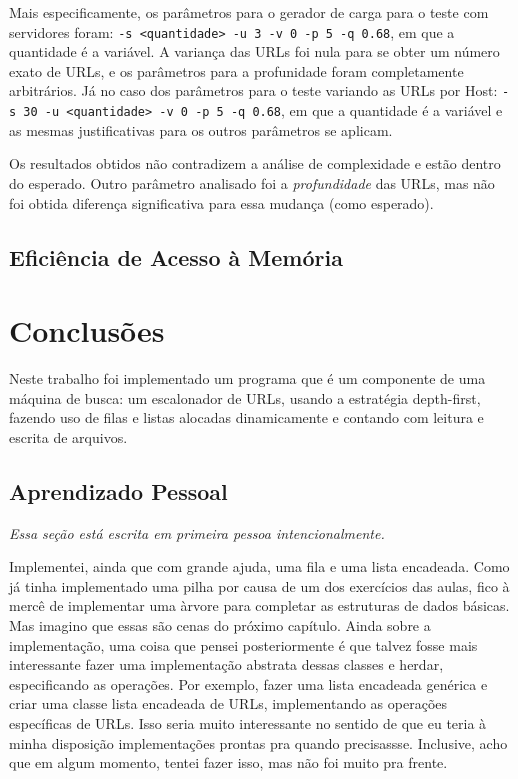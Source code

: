 \documentclass{article}
\def\code#1{\texttt{#1}}
\begin{document}
Mais especificamente, os parâmetros para o gerador de carga para o teste com servidores foram: \code{-s <quantidade> -u 3 -v 0 -p 5 -q 0.68}, em que a quantidade é a variável. A variança das URLs foi nula para se obter um número exato de URLs, e os parâmetros para a profunidade foram completamente arbitrários. Já no caso dos parâmetros para o teste variando as URLs por Host: \code{-s 30 -u <quantidade> -v 0 -p 5 -q 0.68}, em que a quantidade é a variável e as mesmas justificativas para os outros parâmetros se aplicam.

Os resultados obtidos não contradizem a análise de complexidade e estão dentro do esperado. Outro parâmetro analisado foi a \textit{profundidade} das URLs, mas não foi obtida diferença significativa para essa mudança (como esperado).

\subsection{Eficiência de Acesso à Memória}


\section{Conclusões}

Neste trabalho foi implementado um programa que é um componente de uma máquina de busca: um escalonador de URLs, usando a estratégia depth-first, fazendo uso de filas e listas alocadas dinamicamente e contando com leitura e escrita de arquivos.

\subsection{Aprendizado Pessoal}

\textit{Essa seção está escrita em primeira pessoa intencionalmente.}

Implementei, ainda que com grande ajuda, uma fila e uma lista encadeada. Como já tinha implementado uma pilha por causa de um dos exercícios das aulas, fico à mercê de implementar uma àrvore para completar as estruturas de dados básicas. Mas imagino que essas são cenas do próximo capítulo. Ainda sobre a implementação, uma coisa que pensei posteriormente é que talvez fosse mais interessante fazer uma implementação abstrata dessas classes e herdar, especificando as operações. Por exemplo, fazer uma lista encadeada genérica e criar uma classe lista encadeada de URLs, implementando as operações específicas de URLs. Isso seria muito interessante no sentido de que eu teria à minha disposição implementações prontas pra quando precisassse. Inclusive, acho que em algum momento, tentei fazer isso, mas não foi muito pra frente.
\end{document}

